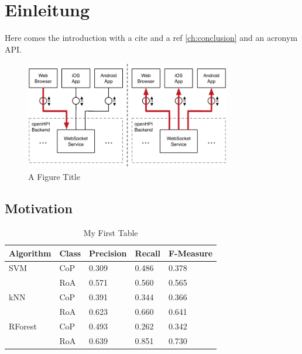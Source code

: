 \chapter{Einleitung}\label{ch:introduction}

Here comes the introduction with a cite \cite{renz2016lak} and a ref \autoref{ch:conclusion} and an acronym \ac{API}.

\begin{figure}[!h]
	\centering
	\includegraphics[width=0.8\textwidth]{figures/websocket}
	\caption[A Figure Short-Title]{A Figure Title}
	\label{fig:websocket}
\end{figure}

\section{Motivation}

\begin{table}[!h]
\centering
\begin{tabular}{@{}lllll@{}}
\toprule
Algorithm & Class & Precision & Recall & F-Measure \\ \midrule
SVM       & CoP   & 0.309     & 0.486  & 0.378     \\ \cmidrule(l){2-5}
          & RoA   & 0.571     & 0.560  & 0.565     \\ \midrule
kNN       & CoP   & 0.391     & 0.344  & 0.366     \\ \cmidrule(l){2-5}
          & RoA   & 0.623     & 0.660  & 0.641     \\ \midrule
RForest   & CoP   & 0.493     & 0.262  & 0.342     \\ \cmidrule(l){2-5}
          & RoA   & 0.639     & 0.851  & 0.730     \\ \bottomrule
\end{tabular}
\caption{My First Table}
\label{tab:first-table}
\end{table}

